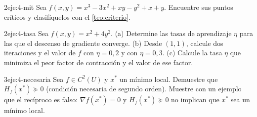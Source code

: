 \begin{ejercicio}{2}{eje:4-mit}
Sea $f(x,y)=x^{3}-3x^{2}+xy-y^{2}+x+y$. Encuentre sus puntos críticos y clasifíquelos con el \cref{teo:criterio}.
\end{ejercicio}

\begin{ejercicio}{2}{eje:4-tasa}
Sea $f(x,y)=x^{2}+4y^{2}$. (a) Determine las tasas de aprendizaje $\eta$ para las que el descenso de gradiente converge. (b) Desde $(1,1)$, calcule dos iteraciones y el valor de $f$ con $\eta=0{,}2$ y con $\eta=0{,}3$. (c) Calcule la tasa $\eta$ que minimiza el peor factor de contracción y el valor de ese factor.
\end{ejercicio}

\begin{ejercicio}{3}{eje:4-necesaria}
Sea $f\in C^{2}(U)$ y $x^{*}$ un mínimo local. Demuestre que $H_f(x^{*})\succeq 0$ (condición necesaria de segundo orden). Muestre con un ejemplo que el recíproco es falso: $\nabla f(x^{*})=0$ y $H_f(x^{*})\succeq 0$ no implican que $x^{*}$ sea un mínimo local.
\end{ejercicio}
